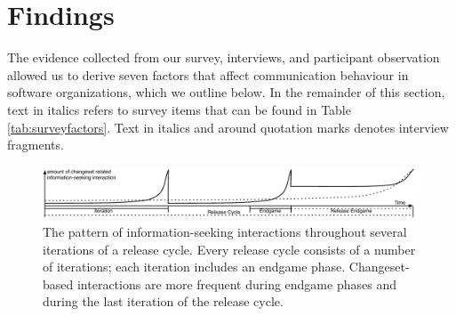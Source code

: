 \documentclass[12pt,oneside]{book}
\begin{document}
\section{Findings}
\label{sec:findings}

The evidence collected from our survey, interviews, and participant observation allowed us to derive seven factors that affect communication behaviour in software organizations, which we outline below. In the remainder of this section, text in italics refers to survey items that can be found in Table \ref{tab:surveyfactors}. Text in italics and around quotation marks denotes interview fragments.

\begin{figure}[tb]
\centering
\includegraphics[width=\textwidth]{figures/findingProcess2}
\vspace{-20pt}\caption{The pattern of information-seeking interactions throughout several iterations of a release cycle. Every release cycle consists of a number of iterations; each iteration includes an endgame phase. Changeset-based interactions are more frequent during endgame phases and during the last iteration of the release cycle.}
\label{IterationsFig}
\end{figure}
\end{document}
